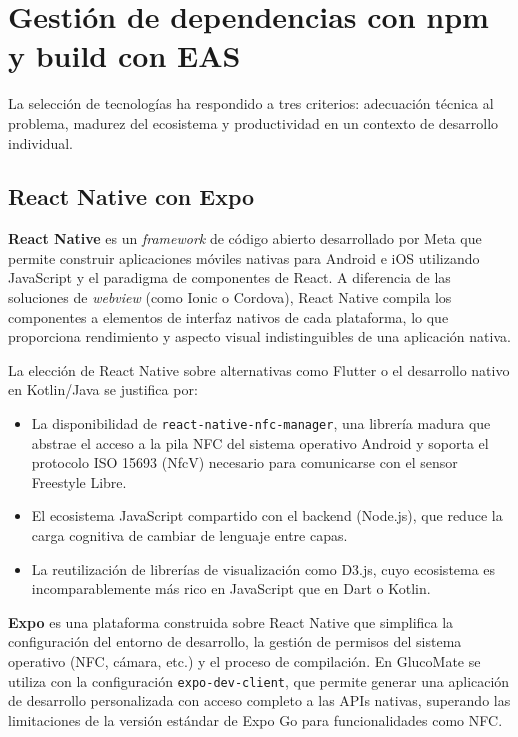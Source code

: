 \section{Gestión de dependencias con npm y build con EAS}
\label{sec:herramientas}

La selección de tecnologías ha respondido a tres criterios: adecuación técnica al
problema, madurez del ecosistema y productividad en un contexto de desarrollo individual.

\subsection{React Native con Expo}
\label{subsec:herramienta-rn}

\textbf{React Native} \cite{facebook2015reactnative} es un \textit{framework} de código
abierto desarrollado por Meta que permite construir aplicaciones móviles nativas para
Android e iOS utilizando JavaScript y el paradigma de componentes de React. A diferencia
de las soluciones de \textit{webview} (como Ionic o Cordova), React Native compila los
componentes a elementos de interfaz nativos de cada plataforma, lo que proporciona
rendimiento y aspecto visual indistinguibles de una aplicación nativa.

La elección de React Native sobre alternativas como Flutter o el desarrollo nativo en
Kotlin/Java se justifica por:

\begin{itemize}
    \item La disponibilidad de \texttt{react-native-nfc-manager}, una librería madura
          que abstrae el acceso a la pila NFC del sistema operativo Android y soporta el
          protocolo ISO 15693 (NfcV) necesario para comunicarse con el sensor Freestyle
          Libre.
    \item El ecosistema JavaScript compartido con el backend (Node.js), que reduce la
          carga cognitiva de cambiar de lenguaje entre capas.
    \item La reutilización de librerías de visualización como D3.js, cuyo ecosistema es
          incomparablemente más rico en JavaScript que en Dart o Kotlin.
\end{itemize}

\textbf{Expo} \cite{expo2020} es una plataforma construida sobre React Native que
simplifica la configuración del entorno de desarrollo, la gestión de permisos del sistema
operativo (NFC, cámara, etc.) y el proceso de compilación. En GlucoMate se utiliza con
la configuración \texttt{expo-dev-client}, que permite generar una aplicación de
desarrollo personalizada con acceso completo a las APIs nativas, superando las
limitaciones de la versión estándar de Expo Go para funcionalidades como NFC.


